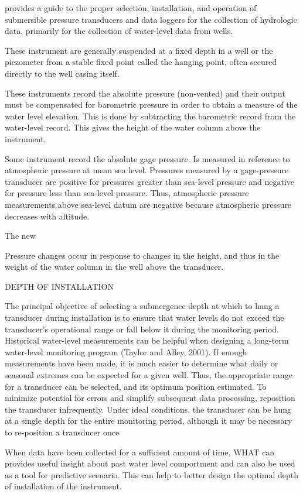 \documentclass[WHATMANUAL.tex]{subfiles}
\begin{document}
\cite{freeman_use_2004} provides a guide to the proper selection, installation, and operation of submersible pressure transducers and data loggers for the collection of hydrologic data, primarily for the collection of water-level data from wells.

These instrument are generally suspended at a fixed depth in a well or the piezometer from a stable fixed point called the hanging point, often secured directly to the well casing itself.

These instruments record the absolute pressure (non-vented) and their output must be compensated for barometric pressure in order to obtain a measure of the water level elevation. This is done by subtracting the barometric record from the water-level record. This gives the height of the water column above the instrument.  

Some instrument record the absolute gage pressure. Is measured in reference to atmospheric pressure at mean sea level. Pressures measured by a gage-pressure transducer are positive for pressures greater than sea-level pressure and negative for pressure less than sea-level pressure. Thus, atmospheric pressure measurements above sea-level datum are negative because atmospheric pressure decreases with altitude.

The new

Pressure changes occur in response to changes in the height, and thus in the weight of the water column in the well above the transducer.

DEPTH OF INSTALLATION

The principal objective of selecting a submergence depth at which to hang a transducer during installation is to ensure that water levels do not exceed the transducer’s operational range or fall below it during the monitoring period. Historical water-level measurements can be helpful when designing a long-term water-level monitoring program (Taylor and Alley, 2001). If enough measurements have been made, it is much easier to determine what daily or seasonal extremes can be expected for a given well. Thus, the appropriate range for a transducer can be selected, and its optimum position estimated. To minimize potential for errors and simplify subsequent data processing, reposition the transducer infrequently. Under ideal conditions, the transducer can be hung at a single depth for the entire monitoring period, although it may be necessary to re-position a transducer once

When data have been collected for a sufficient amount of time, WHAT can provides useful insight about past water level comportment and can also be used as a tool for predictive scenario. This can help to better design the optimal depth of installation of the instrument.
 
\end{document}
